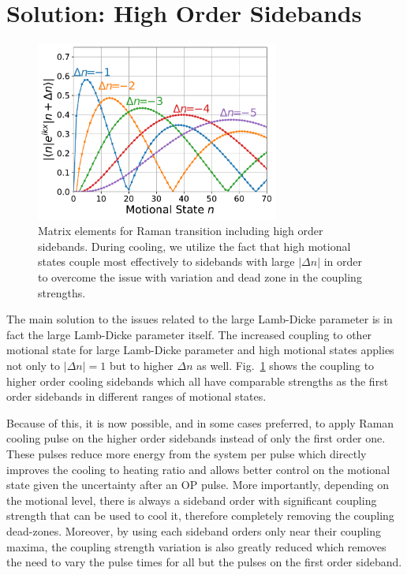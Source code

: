 \section{Solution: High Order Sidebands}
\label{ch:rsc-solution-high-orders}

\begin{figure}
  \centering
  \includegraphics[width=8cm]{figures/na_rsc_mele_raman.pdf}
  \caption[Raman coupling including high order sidebands]{
    Matrix elements for Raman transition including high order sidebands.
    During cooling, we utilize the fact that high motional states couple most effectively
    to sidebands with large $|\Delta n|$ in order to overcome the issue with
    variation and dead zone in the coupling strengths.
    \label{fig:na-rsc-mele-raman}}
\end{figure}

The main solution to the issues related to the large Lamb-Dicke parameter
is in fact the large Lamb-Dicke parameter itself.
The increased coupling to other motional state for large Lamb-Dicke parameter
and high motional states applies not only to $|\Delta n|=1$ but to higher $\Delta n$ as well.
Fig.~\ref{fig:na-rsc-mele-raman} shows the coupling to higher order cooling sidebands
which all have comparable strengths as the first order sidebands in different ranges
of motional states.

Because of this, it is now possible, and in some cases preferred, to apply Raman cooling pulse
on the higher order sidebands instead of only the first order one.
These pulses reduce more energy from the system per pulse which directly improves
the cooling to heating ratio and allows better control on the motional state
given the uncertainty after an OP pulse.
More importantly, depending on the motional level, there is always a sideband order
with significant coupling strength that can be used to cool it,
therefore completely removing the coupling dead-zones.
Moreover, by using each sideband orders only near their coupling maxima,
the coupling strength variation is also greatly reduced which removes
the need to vary the pulse times for all but the pulses on the first order sideband.

